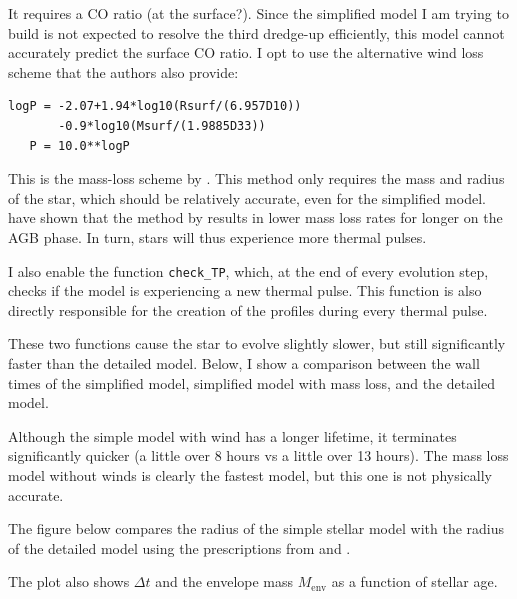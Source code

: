 \documentclass[a4paper,10pt]{article}
\begin{document}
It requires a CO ratio (at the surface?). 
Since the simplified model I am trying to build is not expected to resolve the third dredge-up efficiently, this model cannot accurately predict the surface CO ratio.
I opt to use the alternative wind loss scheme that the authors also provide:

\begin{lstlisting}[style=output, firstnumber=1]
logP = -2.07+1.94*log10(Rsurf/(6.957D10))
       -0.9*log10(Msurf/(1.9885D33))
   P = 10.0**logP
\end{lstlisting}

This is the mass-loss scheme by \citet{vassiliadis1993}. This method only requires the mass and radius of the star, which should be relatively accurate, even for the simplified model. \citet{rees2024b} have shown that the method by \citet{vassiliadis1993} results in lower mass loss rates for longer on the AGB phase. In turn, stars will thus experience more thermal pulses.

I also enable the function \lstinline[style=output, breaklines=true]|check_TP|, which, at the end of every evolution step, checks if the model is experiencing a new thermal pulse. This function is also directly responsible for the creation of the profiles during every thermal pulse.

These two functions cause the star to evolve slightly slower, but still significantly faster than the detailed model. Below, I show a comparison between the wall times of the simplified model, simplified model with mass loss, and the detailed model.

\begin{figure}[ht]
    \centering
\end{figure}

Although the simple model with wind has a longer lifetime, it terminates significantly quicker (a little over 8 hours vs a little over 13 hours). The mass loss model without winds is clearly the fastest model, but this one is not physically accurate.

The figure below compares the radius of the simple stellar model with the radius of the detailed model using the prescriptions from \citet{rees2024a} and \citet{rees2024b}.

The plot also shows \(\Delta t\) and the envelope mass \(M _\text{env}\) as a function of stellar age.


\begin{figure}[ht]
    \centering
\end{figure}
\end{document}
